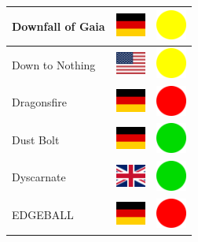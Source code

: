 \documentclass[12pt, a4paper, twoside]{report}
\begin{document}
\begin{center}
\begin{longtable}{|p{5cm}|p{2cm}|p{2cm}|}
			Downfall of Gaia & \includegraphics[width=1cm]{4x3/de} & \includegraphics[width=1cm]{likes/m} \\ \hline
			Down to Nothing & \includegraphics[width=1cm]{4x3/us} & \includegraphics[width=1cm]{likes/m} \\ \hline
			Dragonsfire & \includegraphics[width=1cm]{4x3/de} & \includegraphics[width=1cm]{likes/n} \\ \hline
			Dust Bolt & \includegraphics[width=1cm]{4x3/de} & \includegraphics[width=1cm]{likes/y} \\ \hline
			Dyscarnate & \includegraphics[width=1cm]{4x3/gb} & \includegraphics[width=1cm]{likes/y} \\ \hline
			EDGEBALL & \includegraphics[width=1cm]{4x3/de} & \includegraphics[width=1cm]{likes/n} \\ \hline

\end{longtable}
\end{center}
\end{document}
